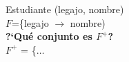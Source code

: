 \documentclass[preview]{standalone}
\begin{document}
Estudiante (legajo, nombre)\\
$F$=\{legajo $\rightarrow$ nombre)\\

\textbf{?`Qu\'e conjunto es $F^+$?}\\

$F^+$ = \big\{$\dots$
\end{document}
